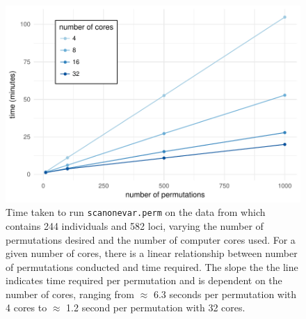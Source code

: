 \documentclass[9pt,twocolumn,twoside]{gsag3jnl}
\begin{document}
\begin{figure}[t]
    \includegraphics[width = \linewidth]{images/benchmark_kumar.pdf}
    \caption{
        Time taken to run \texttt{scanonevar.perm} on the data from \citet{Kumar2013} which contains 244 individuals and 582 loci, varying the number of permutations desired and the number of computer cores used.
        For a given number of cores, there is a linear relationship between number of permutations conducted and time required.
        The slope the the line indicates time required per permutation and is dependent on the number of cores, ranging from $\approx$ 6.3 seconds per permutation with 4 cores to $\approx$ 1.2 second per permutation with 32 cores.
    }
    \label{fig:benchmark_kumar}
\end{figure}
\end{document}
